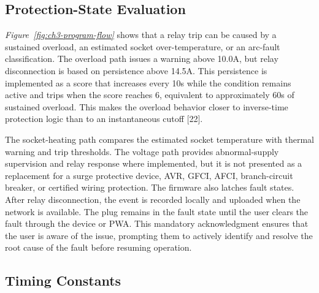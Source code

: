 \subsection{Protection-State Evaluation}
\label{sec:ch3-protection-state-evaluation}

\textit{Figure~\ref{fig:ch3-program-flow}} shows that a relay trip can be caused by a
sustained overload, an estimated socket over-temperature, or an arc-fault
classification. The overload path issues a warning above 10.0A, but relay
disconnection is based on persistence above 14.5A. This persistence is
implemented as a score that increases every 10s while the
condition remains active and trips when the score reaches 6, equivalent to
approximately 60s of sustained overload. This makes the overload behavior
closer to inverse-time protection logic than to an instantaneous cutoff [22].

The socket-heating path compares the estimated socket temperature with thermal
warning and trip thresholds. The voltage path provides abnormal-supply
supervision and relay response where implemented, but it is not presented as a
replacement for a surge protective device, AVR, GFCI, AFCI, branch-circuit
breaker, or certified wiring protection. The firmware also latches fault
states. After relay disconnection, the event is recorded locally and uploaded
when the network is available. The plug remains in the fault state until the
user clears the fault through the device or PWA. This mandatory 
acknowledgment ensures that the user is aware of the issue, prompting 
them to actively identify and resolve the root cause of the fault 
before resuming operation.

\subsection{Timing Constants}
\label{sec:ch3-timing-constants}

